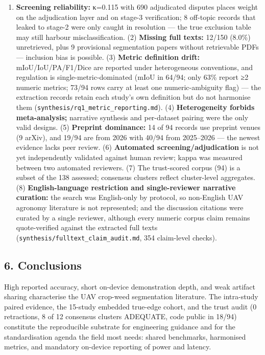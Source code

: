 \documentclass[11pt]{article}
\providecommand{\tightlist}{%
  \setlength{\itemsep}{0pt}\setlength{\parskip}{0pt}}
\begin{document}
\begin{enumerate}
\def\labelenumi{(\arabic{enumi})}
\tightlist
\item
  \textbf{Screening reliability:} κ=0.115 with 690 adjudicated disputes
  places weight on the adjudication layer and on stage-3 verification; 8
  off-topic records that leaked to stage-2 were only caught in
  resolution --- the true exclusion table may still harbour
  misclassification. (2) \textbf{Missing full texts:} 12/150 (8.0\%)
  unretrieved, plus 9 provisional segmentation papers without
  retrievable PDFs --- inclusion bias is possible. (3) \textbf{Metric
  definition drift:} mIoU/IoU/PA/F1/Dice are reported under
  heterogeneous conventions, and regulation is single-metric-dominated
  (mIoU in 64/94; only 63\% report ≥2 numeric metrics; 73/94 rows carry
  at least one numeric-ambiguity flag) --- the extraction records retain
  each study's own definition but do not harmonise them
  (\texttt{synthesis/rq1\_metric\_reporting.md}). (4)
  \textbf{Heterogeneity forbids meta-analysis;} narrative synthesis and
  per-dataset pairing were the only valid designs. (5) \textbf{Preprint
  dominance:} 14 of 94 records use preprint venues (9 arXiv), and 19/94
  are from 2026 with 40/94 from 2025--2026 --- the newest evidence lacks
  peer review. (6) \textbf{Automated screening/adjudication} is not yet
  independently validated against human review; kappa was measured
  between two automated reviewers. (7) The trust-scored corpus (94) is a
  subset of the 138 assessed; consensus clusters reflect cluster-level
  aggregates. (8) \textbf{English-language restriction and
  single-reviewer narrative curation:} the search was English-only by
  protocol, so non-English UAV agronomy literature is not represented;
  and the discussion citations were curated by a single reviewer,
  although every numeric corpus claim remains quote-verified against the
  extracted full texts (\texttt{synthesis/fulltext\_claim\_audit.md},
  354 claim-level checks).
\end{enumerate}

\subsection{6. Conclusions}\label{conclusions}

High reported accuracy, short on-device demonstration depth, and weak
artifact sharing characterise the UAV crop-weed segmentation literature.
The intra-study paired evidence, the 15-study embedded true-edge cohort,
and the trust audit (0 retractions, 8 of 12 consensus clusters ADEQUATE,
code public in 18/94) constitute the reproducible substrate for
engineering guidance and for the standardisation agenda the field most
needs: shared benchmarks, harmonised metrics, and mandatory on-device
reporting of power and latency.
\end{document}
